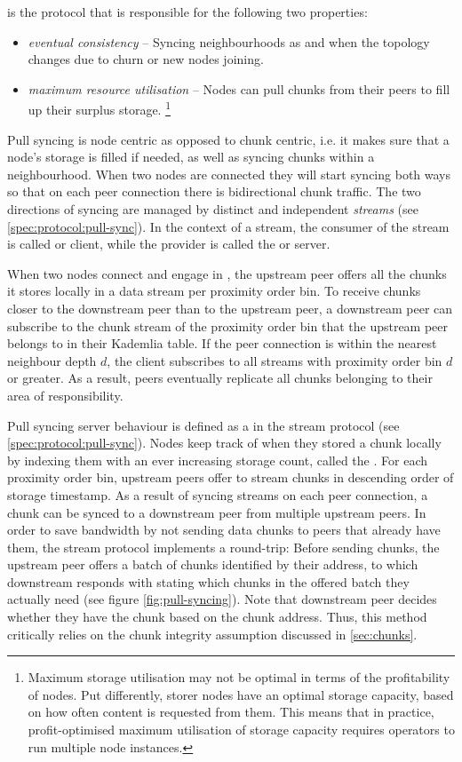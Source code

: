  is the protocol that is responsible for the following two properties: 

\begin{itemize}
    \item \emph{eventual consistency} -- Syncing neighbourhoods as and when the topology changes due to churn or new nodes joining.
    \item \emph{maximum resource utilisation} -- Nodes can pull chunks from their peers to fill up their surplus storage.%
%
\footnote{Maximum storage utilisation may not be optimal in terms of the profitability of nodes. Put differently, storer nodes have an optimal storage capacity, based on how often content is requested from them. This means that in practice, profit-optimised maximum utilisation of storage capacity requires operators to run multiple node instances.}
\end{itemize}

Pull syncing is node centric as opposed to chunk centric, i.e. it makes sure that a node's storage is filled if needed, as well as syncing chunks within a neighbourhood. When two nodes are connected they will start syncing both ways so that on each peer connection there is bidirectional chunk traffic. The two directions of syncing are managed by distinct and independent \emph{streams} (see \ref{spec:protocol:pull-sync}). In the context of a stream, the consumer of the stream is called  or client, while the provider is called the  or server. 

When two nodes connect and engage in , the upstream peer offers all the chunks it stores locally in a data stream per proximity order bin. To receive chunks closer to the downstream peer than to the upstream peer, a downstream peer can subscribe to the chunk stream of the proximity order bin that the upstream peer belongs to in their Kademlia table. If the peer connection is within the nearest neighbour depth $d$, the client subscribes to all streams with proximity order bin $d$ or greater. As a result, peers eventually replicate all chunks belonging to their area of responsibility.

Pull syncing server behaviour is defined as a  in the stream protocol (see \ref{spec:protocol:pull-sync}). Nodes keep track of when they stored a chunk locally by indexing them with an ever increasing storage count, called the . For each proximity order bin, upstream peers offer to stream chunks in descending order of storage timestamp. As a result of syncing streams on each peer connection, a chunk can be synced to a downstream peer from multiple upstream peers. In order to save bandwidth by not sending data chunks to peers that already have them, the stream protocol implements a round-trip: Before sending chunks, the upstream peer offers a batch of chunks identified by their address, to which downstream responds with stating which chunks in the offered batch they actually need (see figure \ref{fig:pull-syncing}). Note that downstream peer decides whether they have the chunk based on the chunk address. Thus, this method critically relies on the chunk integrity assumption discussed in \ref{sec:chunks}.



